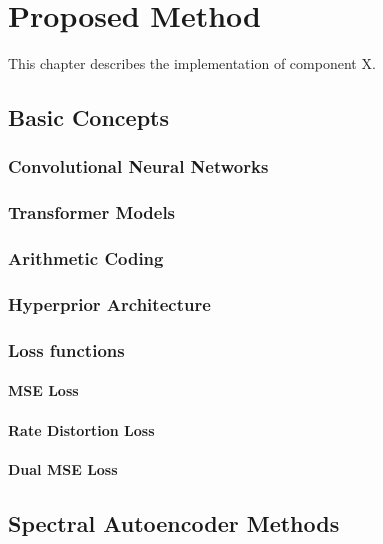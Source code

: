 \chapter{Proposed Method\label{cha:chapter3}}

This chapter describes the implementation of component X.

\section{Basic Concepts\label{sec:ch3basic}}

\subsection{Convolutional Neural Networks}

\subsection{Transformer Models}

\subsection{Arithmetic Coding}

\subsection{Hyperprior Architecture}

\subsection{Loss functions}

\subsubsection{MSE Loss}

\subsubsection{Rate Distortion Loss}

\subsubsection{Dual MSE Loss}

\section{Spectral Autoencoder Methods}

